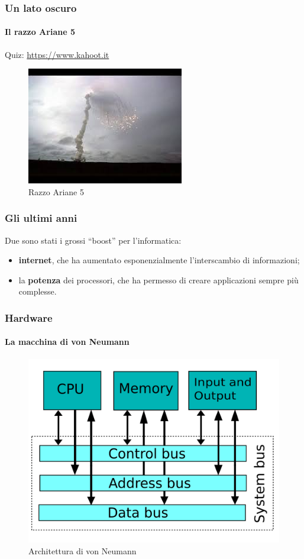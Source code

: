 \documentclass[11pt]{beamer}
\begin{document}
    \begin{frame}
        \frametitle{Un lato oscuro}
        \framesubtitle{Il razzo Ariane 5}
        
        \centering
        Quiz: \href{https://www.kahoot.it}{https://www.kahoot.it}
        
        \begin{figure}
            \includegraphics[scale=0.7]{img/ariane-5-explosion.jpg}
            \caption{Razzo Ariane 5}
        \end{figure}
    \end{frame}

    \begin{frame}
        \frametitle{Gli ultimi anni}
        
        Due sono stati i grossi ``boost'' per l'informatica:
        
        \begin{itemize}
            \item \textbf{internet}, che ha aumentato esponenzialmente l'interscambio di informazioni;
            \item la \textbf{potenza} dei processori, che ha permesso di creare applicazioni sempre più complesse.
        \end{itemize}
    \end{frame}

    \begin{frame}
        \frametitle{Hardware}
        \framesubtitle{La macchina di von Neumann}
        
        \begin{figure}
            \includegraphics[scale=0.15]{img/macchina-von-neumann.png}
            \caption{Architettura di von Neumann}
        \end{figure}
    \end{frame}
\end{document}
